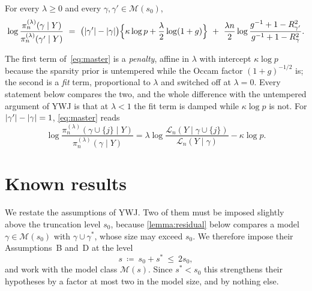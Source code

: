 \documentclass[aos]{imsart}
\DeclarePairedDelimiter{\abs}{\lvert}{\rvert}
\theoremstyle{plain}
\theoremstyle{definition}
\begin{document}
    For every $\lambda\geq0$ and every $\gamma,\gamma'\in\mathscr{M}(s_0)$,
    \begin{equation}
        \label{eq:master}
        \log\frac{\pi_n^{(\lambda)}(\gamma\mid Y)}
        {\pi_n^{(\lambda)}(\gamma'\mid Y)}
        \ =\ \bigl(\abs{\gamma'}-\abs{\gamma}\bigr)
        \Bigl\{\kappa\log p+\frac{\lambda}{2}\log(1+g)\Bigr\}
        \ +\ \frac{\lambda n}{2}
        \log\frac{g^{-1}+1-R^{2}_{\gamma'}}
        {g^{-1}+1-R^{2}_{\gamma}} .
    \end{equation}


    The first term of~\eqref{eq:master} is a \emph{penalty}, affine in
    $\lambda$ with intercept $\kappa\log p$ because the sparsity prior is
    untempered while the Occam factor $(1+g)^{-1/2}$ is; the second is a
    \emph{fit} term, proportional to $\lambda$ and switched off at
    $\lambda=0$. Every statement below compares the two, and the whole
    difference with the untempered argument of YWJ is that at $\lambda<1$
    the fit term is damped while $\kappa\log p$ is not. For $\abs{\gamma'}-\abs{\gamma}=1$, \eqref{eq:master}
    reads
    \begin{equation}
        \label{eq:onestep}
        \log\frac{\pi_n^{(\lambda)}(\gamma\cup\{j\}\mid Y)}
        {\pi_n^{(\lambda)}(\gamma\mid Y)}
        =\lambda\log\frac{\mathcal{L}_n(Y\mid\gamma\cup\{j\})}
        {\mathcal{L}_n(Y\mid\gamma)}-\kappa\log p .
    \end{equation}




    \section{Known results}
    \label{sec:assumptions}

    We restate the assumptions of YWJ. Two of them must be imposed slightly
    above the truncation level $s_0$, because \cref{lemma:residual} below
    compares a model $\gamma\in\mathscr{M}(s_0)$ with
    $\gamma\cup\gamma^{\ast}$, whose size may exceed $s_0$. We therefore
    impose their Assumptions~B and~D at the level
    \begin{equation}
        \label{eq:slevel}
        s\ \coloneq\ s_0+s^{\ast}\ \leq\ 2s_0 ,
    \end{equation}
    and work with the model class $\mathscr{M}(s)$. Since $s^{\ast}<s_0$ this
    strengthens their hypotheses by a factor at most two in the model size,
    and by nothing else.
\end{document}
